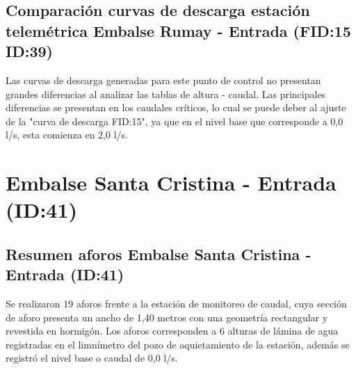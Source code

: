 \documentclass[]{article}
\begin{document}
\subsection{Comparación curvas de descarga estación telemétrica Embalse Rumay - Entrada (FID:15 ID:39)}\label{comparación curvas}

Las curvas de descarga generadas para este punto de control no presentan grandes diferencias al analizar las tablas de altura - caudal. Las principales diferencias se presentan en los caudales críticos, lo cual se puede deber al ajuste de la "curva de descarga FID:15", ya que en el nivel base que corresponde a 0,0 l/s, esta comienza en 2,0 l/s.

\clearpage

\section{Embalse Santa Cristina - Entrada (ID:41)}\label{ID:41}

\subsection{Resumen aforos Embalse Santa Cristina - Entrada (ID:41)}\label{aforos ID:41}

Se realizaron 19 aforos frente a la estación de monitoreo de caudal, cuya sección de aforo presenta un ancho de 1,40 metros con una geometría rectangular y revestida en hormigón.  Los aforos corresponden a 6 alturas de lámina de agua registradas en el limnímetro del pozo de aquietamiento de la estación, además se registró el nivel base o caudal de 0,0 l/s.
\end{document}
